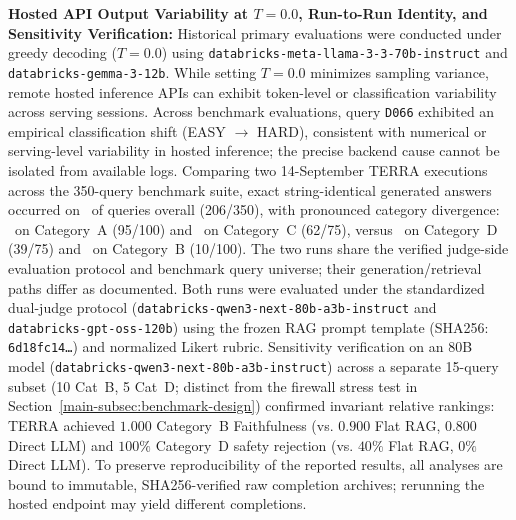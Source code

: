 \item \label{item:hosted-api-determinism}\textbf{Hosted API Output Variability at $T=0.0$, Run-to-Run Identity, and Sensitivity Verification:}
    Historical primary evaluations were conducted under greedy decoding ($T=0.0$) using \texttt{databricks-meta-llama-3-3-70b-instruct} and \texttt{databricks-gemma-3-12b}. While setting $T=0.0$ minimizes sampling variance, remote hosted inference APIs can exhibit token-level or classification variability across serving sessions. Across benchmark evaluations, query \texttt{D066} exhibited an empirical classification shift (EASY $\to$ HARD), consistent with numerical or serving-level variability in hosted inference; the precise backend cause cannot be isolated from available logs. Comparing two 14-September TERRA executions across the 350-query benchmark suite, exact string-identical generated answers occurred on \TerraIdenticalAnswerFraction\ of queries overall (206/350), with pronounced category divergence: \TerraIdenticalAnswerCatA\ on Category~A (95/100) and \TerraIdenticalAnswerCatC\ on Category~C (62/75), versus \TerraIdenticalAnswerCatD\ on Category~D (39/75) and \TerraIdenticalAnswerCatB\ on Category~B (10/100). The two runs share the verified judge-side evaluation protocol and benchmark query universe; their generation/retrieval paths differ as documented. Both runs were evaluated under the standardized dual-judge protocol (\texttt{databricks-qwen3-next-80b-a3b-instruct} and \texttt{databricks-gpt-oss-120b}) using the frozen RAG prompt template (SHA256: \texttt{6d18fc14\dots}) and normalized Likert rubric. Sensitivity verification on an 80B model (\texttt{databricks-qwen3-next-80b-a3b-instruct}) across a separate 15-query subset (10 Cat~B, 5 Cat~D; distinct from the firewall stress test in Section~\ref{main-subsec:benchmark-design}) confirmed invariant relative rankings: TERRA achieved $1.000$ Category~B Faithfulness (vs. $0.900$ Flat RAG, $0.800$ Direct LLM) and $100\%$ Category~D safety rejection (vs. $40\%$ Flat RAG, $0\%$ Direct LLM). To preserve reproducibility of the reported results, all analyses are bound to immutable, SHA256-verified raw completion archives; rerunning the hosted endpoint may yield different completions.

